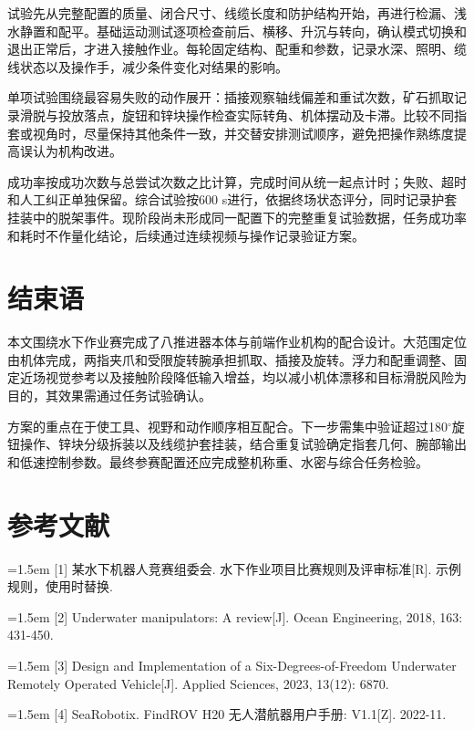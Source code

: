 试验先从完整配置的质量、闭合尺寸、线缆长度和防护结构开始，再进行检漏、浅水静置和配平。基础运动测试逐项检查前后、横移、升沉与转向，确认模式切换和退出正常后，才进入接触作业。每轮固定结构、配重和参数，记录水深、照明、缆线状态以及操作手，减少条件变化对结果的影响。\par

单项试验围绕最容易失败的动作展开：插接观察轴线偏差和重试次数，矿石抓取记录滑脱与投放落点，旋钮和锌块操作检查实际转角、机体摆动及卡滞。比较不同指套或视角时，尽量保持其他条件一致，并交替安排测试顺序，避免把操作熟练度提高误认为机构改进。\par

成功率按成功次数与总尝试次数之比计算，完成时间从统一起点计时；失败、超时和人工纠正单独保留。综合试验按600 s进行，依据终场状态评分，同时记录护套挂装中的脱架事件。现阶段尚未形成同一配置下的完整重复试验数据，任务成功率和耗时不作量化结论，后续通过连续视频与操作记录验证方案。\par

\section{结束语}

本文围绕水下作业赛完成了八推进器本体与前端作业机构的配合设计。大范围定位由机体完成，两指夹爪和受限旋转腕承担抓取、插接及旋转。浮力和配重调整、固定近场视觉参考以及接触阶段降低输入增益，均以减小机体漂移和目标滑脱风险为目的，其效果需通过任务试验确认。\par

方案的重点在于使工具、视野和动作顺序相互配合。下一步需集中验证超过180\(^{\circ}\)旋钮操作、锌块分级拆装以及线缆护套挂装，结合重复试验确定指套几何、腕部输出和低速控制参数。最终参赛配置还应完成整机称重、水密与综合任务检验。\par

\section*{参考文献}

{\fontsize{9}{12}\selectfont\noindent\hangindent=1.5em [1] 某水下机器人竞赛组委会. 水下作业项目比赛规则及评审标准[R]. 示例规则，使用时替换.\par}\smallskip

{\fontsize{9}{12}\selectfont\noindent\hangindent=1.5em [2] Underwater manipulators: A review[J]. Ocean Engineering, 2018, 163: 431-450.\par}\smallskip

{\fontsize{9}{12}\selectfont\noindent\hangindent=1.5em [3] Design and Implementation of a Six-Degrees-of-Freedom Underwater Remotely Operated Vehicle[J]. Applied Sciences, 2023, 13(12): 6870.\par}\smallskip

{\fontsize{9}{12}\selectfont\noindent\hangindent=1.5em [4] SeaRobotix. FindROV H20 无人潜航器用户手册: V1.1[Z]. 2022-11.\par}\smallskip